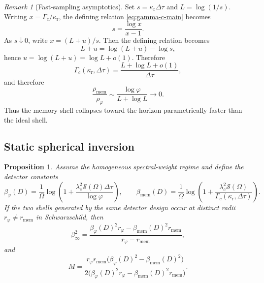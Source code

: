 \documentclass[11pt]{amsart}
\numberwithin{equation}{section}
\newtheorem{proposition}[theorem]{Proposition}
\theoremstyle{remark}
\newtheorem{remark}[theorem]{Remark}
\begin{document}
\begin{remark}[Fast-sampling asymptotics]\label{rem:fast-sampling}
Set $s=\kappa_{\mathrm r}\Delta\tau$ and $L=\log(1/s)$. Writing $x=\Gamma_c/\kappa_{\mathrm r}$, the defining relation \eqref{eq:gamma-c-main} becomes
\[
s=\frac{\log x}{x-1}.
\]
As $s\downarrow0$, write $x=(L+u)/s$. Then the defining relation becomes
\[
L+u=\log(L+u)-\log s,
\]
hence $u=\log(L+u)=\log L+o(1)$. Therefore
\begin{equation}\label{eq:fast-sampling-main}
\Gamma_c(\kappa_{\mathrm r},\Delta\tau)
=
\frac{L+\log L+o(1)}{\Delta\tau},
\end{equation}
and therefore
\begin{equation}\label{eq:fast-ratio-main}
\frac{\rho_{\mathrm{mem}}}{\rho_{\varphi}}
\sim
\frac{\log\varphi}{L+\log L}
\longrightarrow0.
\end{equation}
Thus the memory shell collapses toward the horizon parametrically faster than the ideal shell.
\end{remark}

\subsection{Static spherical inversion}

\begin{proposition}\label{prop:schw-main}
Assume the homogeneous spectral-weight regime and define the detector constants
\begin{equation}\label{eq:beta-constants-main}
\beta_{\varphi}(D)=
\frac{1}{\Omega}
\log\!\left(1+\frac{\lambda_c^2\mathcal S(\Omega)\Delta\tau}{\log\varphi}\right),
\qquad
\beta_{\mathrm{mem}}(D)=
\frac{1}{\Omega}
\log\!\left(1+\frac{\lambda_c^2\mathcal S(\Omega)}
{\Gamma_c(\kappa_{\mathrm r},\Delta\tau)}\right).
\end{equation}
If the two shells generated by the same detector design occur at distinct radii $r_{\varphi}\neq r_{\mathrm{mem}}$ in Schwarzschild, then
\begin{equation}\label{eq:beta-infty-main}
\beta_\infty^2=
\frac{\beta_{\varphi}(D)^2r_{\varphi}-\beta_{\mathrm{mem}}(D)^2r_{\mathrm{mem}}}
{r_{\varphi}-r_{\mathrm{mem}}},
\end{equation}
and
\begin{equation}\label{eq:mass-main}
M=
\frac{r_{\varphi}r_{\mathrm{mem}}\bigl(\beta_{\varphi}(D)^2-\beta_{\mathrm{mem}}(D)^2\bigr)}
{2\bigl(\beta_{\varphi}(D)^2r_{\varphi}-\beta_{\mathrm{mem}}(D)^2r_{\mathrm{mem}}\bigr)}.
\end{equation}
\end{proposition}
\end{document}
